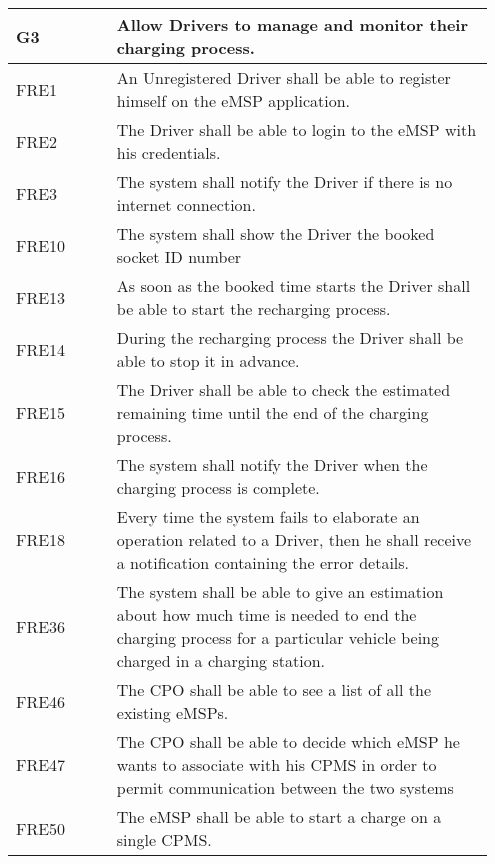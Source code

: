{\renewcommand{\arraystretch}{1.5}
\begin{longtable}{|p{0.20\linewidth}p{0.75\linewidth} |}
    \hline
    \rowcolor{bluepoli!40}\textbf{G3} & \textbf{Allow Drivers to manage and monitor their charging process.} \\
    \hline
    \rowcolor{bluepoli!15} FRE1 & An Unregistered Driver shall be able to register himself on the eMSP application. \\
    \hline
    \rowcolor{bluepoli!15} FRE2 & The Driver shall be able to login to the eMSP with his credentials. \\
    \hline 
    \rowcolor{bluepoli!15} FRE3 & The system shall notify the Driver if there is no internet connection. \\
    \hline 
    \rowcolor{bluepoli!15}
    FRE10\textbf &The system shall show the Driver the booked socket ID number\\
    \hline
    \rowcolor{bluepoli!15} FRE13 & As soon as the booked time starts the Driver shall be able to start the recharging process. \\
    \hline
    \rowcolor{bluepoli!15} FRE14 & During the recharging process the Driver shall be able to stop it in advance. \\
    \hline
    \rowcolor{bluepoli!15} FRE15 & The Driver shall be able to check the estimated remaining time until the end of the charging process. \\
    \hline
    \rowcolor{bluepoli!15} FRE16 & The system shall notify the Driver when the charging process is complete. \\
    \hline
    \rowcolor{bluepoli!15} FRE18 & Every time the system fails to elaborate an operation related to a Driver, then he shall receive a notification containing the error details. \\
    \hline
    \rowcolor{bluepoli!15} FRE36 & The system shall be able to give an estimation about how much time is needed to end the charging process for a particular vehicle being charged in a charging station. \\
    \hline
    \rowcolor{bluepoli!15}
    FRE46 & The CPO shall be able to see a list of all the existing eMSPs. \\
    \hline
    \rowcolor{bluepoli!15} FRE47 &  The CPO shall be able to decide which eMSP he wants to associate with his CPMS in order to permit communication between the two systems \\
    \hline
    \rowcolor{bluepoli!15} FRE50 & The eMSP shall be able to start a charge on a single CPMS. \\

\end{longtable}}
